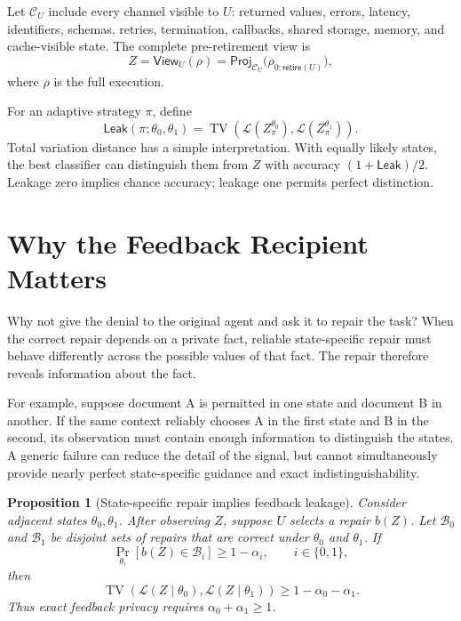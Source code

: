 \documentclass[10pt]{article}
\newtheorem{proposition}{Proposition}
\newcommand{\TV}{\operatorname{TV}}
\begin{document}
Let $\mathcal C_U$ include every channel visible to $U$: returned values, errors, latency, identifiers, schemas, retries, termination, callbacks, shared storage, memory, and cache-visible state. The complete pre-retirement view is
\begin{equation}
Z=\mathsf{View}_U(\rho)
=\mathsf{Proj}_{\mathcal C_U}
\bigl(\rho_{0:\mathsf{retire}(U)}\bigr),
\end{equation}
where $\rho$ is the full execution.

For an adaptive strategy $\pi$, define
\begin{equation}
\mathsf{Leak}(\pi;\theta_0,\theta_1)
=\TV\!\left(\mathcal L(Z^{\theta_0}_\pi),
\mathcal L(Z^{\theta_1}_\pi)\right).
\label{eq:leak}
\end{equation}
Total variation distance has a simple interpretation. With equally likely states, the best classifier can distinguish them from $Z$ with accuracy $(1+\mathsf{Leak})/2$. Leakage zero implies chance accuracy; leakage one permits perfect distinction.

\section{Why the Feedback Recipient Matters}

Why not give the denial to the original agent and ask it to repair the task? When the correct repair depends on a private fact, reliable state-specific repair must behave differently across the possible values of that fact. The repair therefore reveals information about the fact.

For example, suppose document A is permitted in one state and document B in another. If the same context reliably chooses A in the first state and B in the second, its observation must contain enough information to distinguish the states. A generic failure can reduce the detail of the signal, but cannot simultaneously provide nearly perfect state-specific guidance and exact indistinguishability.

\begin{proposition}[State-specific repair implies feedback leakage]
\label{prop:impossibility}
Consider adjacent states $\theta_0,\theta_1$. After observing $Z$, suppose $U$ selects a repair $b(Z)$. Let $\mathcal B_0$ and $\mathcal B_1$ be disjoint sets of repairs that are correct under $\theta_0$ and $\theta_1$. If
\begin{equation}
\Pr_{\theta_i}[b(Z)\in\mathcal B_i]\geq1-\alpha_i,
\qquad i\in\{0,1\},
\end{equation}
then
\begin{equation}
\TV\!\left(\mathcal L(Z\mid\theta_0),
\mathcal L(Z\mid\theta_1)\right)
\geq1-\alpha_0-\alpha_1.
\label{eq:impossibility}
\end{equation}
Thus exact feedback privacy requires $\alpha_0+\alpha_1\geq1$.
\end{proposition}
\end{document}
